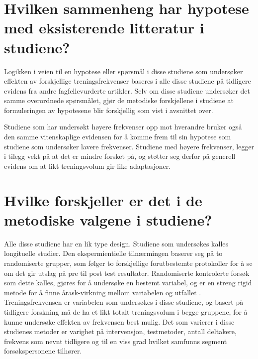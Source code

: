 \documentclass[
]{book}
\begin{document}
\hypertarget{hvilken-sammenheng-har-hypotese-med-eksisterende-litteratur-i-studiene}{%
\section{Hvilken sammenheng har hypotese med eksisterende litteratur i studiene?}\label{hvilken-sammenheng-har-hypotese-med-eksisterende-litteratur-i-studiene}}

Logikken i veien til en hypotese eller spørsmål i disse studiene som undersøker effekten av forskjellige treningsfrekvenser baseres i alle disse studiene på tidligere evidens fra andre fagfellevurderte artikler\citep{brigatto2019, gentil2018, johnsen2021, saric2019, lasevicius2019}. Selv om disse studiene undersøker det samme overordnede spørsmålet, gjør de metodiske forskjellene i studiene at formuleringen av hypotesene blir forskjellig som vist i avsnittet over.

Studiene som har undersøkt høyere frekvenser opp mot hverandre \citep{johnsen2021, saric2019} bruker også den samme vitenskaplige evidensen for å komme frem til sin hypotese som studiene som undersøker lavere frekvenser\citep{brigatto2019, gentil2018, lasevicius2019}. Studiene med høyere frekvenser, legger i tilegg vekt på at det er mindre forsket på, og støtter seg derfor på generell evidens om at likt treningsvolum gir like adaptasjoner\citep{johnsen2021, saric2019}.

\hypertarget{hvilke-forskjeller-er-det-i-de-metodiske-valgene-i-studiene}{%
\section{Hvilke forskjeller er det i de metodiske valgene i studiene?}\label{hvilke-forskjeller-er-det-i-de-metodiske-valgene-i-studiene}}

Alle disse studiene har en lik type design. Studiene som undersøkes kalles longituelle studier. Den ekspermientielle tilnærmingen baserer seg på to randomiserte grupper, som følger to forskjellige forutbestemte protokoller for å se om det gir utslag på pre til post test resultater. Randomiserte kontrolerte forsøk som dette kalles, gjøres for å undersøke en bestemt variabel, og er en streng rigid metode for å finne årask-virkning mellom variabelen og utfallet \citep{sibbald1998}. Treningsfrekvensen er variabelen som undersøkes i disse studiene, og basert på tidligere forskning må de ha et likt totalt treningsvolum i begge gruppene, for å kunne undersøke effekten av frekvensen best mulig. Det som varierer i disse studienes metoder er varighet på intervensjon, testmetoder, antall deltakere, frekvens som nevnt tidligere og til en viss grad hvilket samfunns segment forsøkspersonene tilhører.
\end{document}

